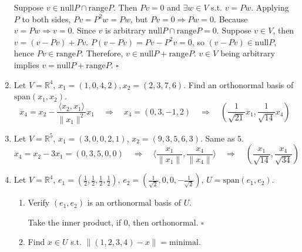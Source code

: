 \documentclass[10pt]{article}
\newenvironment{proof}{\noindent{\bf Proof.}}{\hfill $\square$\medskip}
\begin{document}
\begin{enumerate}
    \begin{proof}
        Suppose $v\in\text{null}P\cap\text{range}P$. Then $Pv=0$ and $\exists w\in V$ s.t. $v=Pw$. Applying $P$ to both sides, $Pv=P^{2}w=Pw$, but $Pv=0\Rightarrow Pw=0$. Because $v=Pw\Rightarrow v=0$. Since $v$ is arbitrary $\text{null}P\cap\text{range}P=0$. Suppose $v\in V$, then $v=(v-Pv)+Pv$. $P(v-Pv)=Pv-P^{2}v=0$, so $(v-Pv)\in\text{null}P$, hence $Pv\in\text{range}P$. Therefore, $v\in\text{null}P+\text{range}P$. $v\in V$ being arbitrary implies $v=\text{null}P+\text{range}P$.
    \end{proof}

    \item Let $V=\mathbb{R}^{4}$, $x_{1}=(1,0,4,2), x_{2}=(2,3,7,6)$. Find an orthonormal basis of $\text{span}(x_{1},x_{2})$.
    $$x_{4}=x_{2}-\frac{\langle x_{2},x_{1}\rangle}{\lVert x_{1}\rVert^{2}}x_{1}\quad\Rightarrow\quad x_{4}=(0,3,-1,2)\quad\Rightarrow\quad (\frac{1}{\sqrt{21}}x_{1},\frac{1}{\sqrt{14}}x_{4})$$

    \item Let $V=\mathbb{R}^{5}$, $x_{1}=(3,0,0,2,1)$, $x_{2}=(9,3,5,6,3)$. Same as $5$.
    $$x_{4}=x_{2}-3x_{1}=(0,3,5,0,0)\quad\Rightarrow\quad\langle\frac{x_{1}}{\lVert x_{1}\rVert},\frac{x_{4}}{\lVert x_{4}\rVert}\rangle\quad\Rightarrow\quad\left(\frac{x_{1}}{\sqrt{14}},\frac{x_{4}}{\sqrt{34}}\right)$$

    \item Let $V=\mathbb{R}^{4}$, $e_{1}=(\frac{1}{2},\frac{1}{2},\frac{1}{2},\frac{1}{2})$, $e_{2}=(\frac{1}{\sqrt{2}},0,0,-\frac{1}{\sqrt{2}})$, $U=\text{span}(e_{1},e_{2})$.
        \begin{enumerate}[label=(\roman*)]
            \item Verify $(e_{1},e_{2})$ is an orthonormal basis of $U$.

            \begin{proof}
                Take the inner product, if $0$, then orthonormal.
            \end{proof}
            \item Find $x\in U$ s.t. $\lVert(1,2,3,4)-x\rVert=\text{minimal}$.


\end{enumerate}
\end{enumerate}
\end{document}
